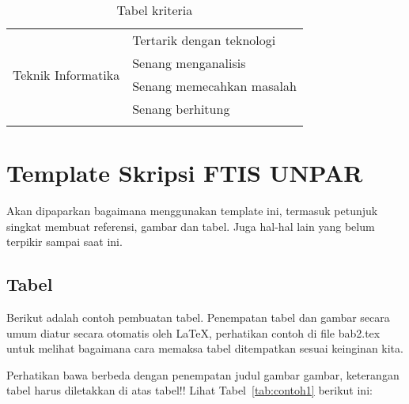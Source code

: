 \begin{longtable}[H]{| p{6cm} | p{8cm} |}
		\hline
		\multirow{4}{10em}{Teknik Informatika} & Tertarik dengan teknologi \\
		& Senang menganalisis \\
		& Senang memecahkan masalah \\
		& Senang berhitung \\
		
		\hline
	\caption{Tabel kriteria}
	\label{tab:tabel kriteri}
\end{longtable}


\section{Template Skripsi FTIS UNPAR}
\label{sec:template}
 
Akan dipaparkan bagaimana menggunakan template ini, termasuk petunjuk singkat membuat referensi, gambar dan tabel.
Juga hal-hal lain yang belum terpikir sampai saat ini. 
 

\subsection{Tabel}  
Berikut adalah contoh pembuatan tabel. 
Penempatan tabel dan gambar secara umum diatur secara otomatis oleh \LaTeX{}, perhatikan contoh di file bab2.tex untuk melihat bagaimana cara memaksa tabel ditempatkan sesuai keinginan kita.

Perhatikan bawa berbeda dengan penempatan judul gambar gambar, keterangan tabel harus diletakkan di atas tabel!!
Lihat Tabel~\ref{tab:contoh1} berikut ini:

